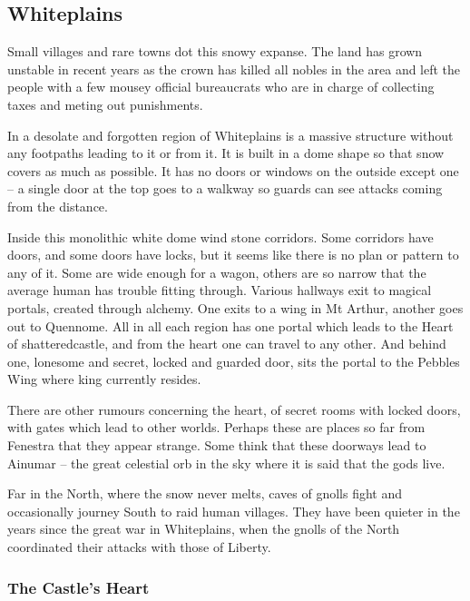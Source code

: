 \begin{multicols}{2}
{\begin{itemize}
  \end{itemize}
}{
  \encWhiteplains
}


\subsection{Whiteplains}

Small villages and rare towns dot this snowy expanse.  The land has grown unstable in recent years as the crown has killed all nobles in the area and left the people with a few mousey official bureaucrats who are in charge of collecting taxes and meting out punishments.

In a desolate and forgotten region of Whiteplains is a massive structure without any footpaths leading to it or from it.
It is built in a dome shape so that snow covers as much as possible.
It has no doors or windows on the outside except one -- a single door at the top goes to a walkway so guards can see attacks coming from the distance.

Inside this monolithic white dome wind stone corridors.
Some corridors have doors, and some doors have locks, but it seems like there is no plan or pattern to any of it.
Some are wide enough for a wagon, others are so narrow that the average human has trouble fitting through.
Various hallways exit to magical portals, created through alchemy.
One exits to a wing in Mt Arthur, another goes out to Quennome.
All in all each region has one portal which leads to the Heart of \gls{shatteredcastle}, and from the heart one can travel to any other.
And behind one, lonesome and secret, locked and guarded door, sits the portal to the Pebbles Wing where \gls{king} currently resides.

There are other rumours concerning the heart, of secret rooms with locked doors, with gates which lead to other worlds.  Perhaps these are places so far from Fenestra that they appear strange.  Some think that these doorways lead to Ainumar -- the great celestial orb in the sky where it is said that the gods live.

Far in the North, where the snow never melts, caves of gnolls fight and occasionally journey South to raid human villages.
They have been quieter in the years since the great war in Whiteplains, when the gnolls of the North coordinated their attacks with those of Liberty.

\subsubsection{The Castle's Heart}\label{whiteland_heart}


\end{multicols}
